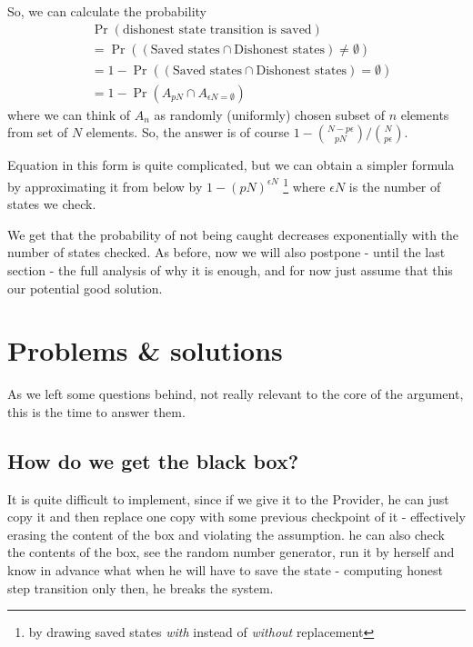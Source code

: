 \documentclass{winnower}
\begin{document}
So, we can calculate the probability 
\begin{equation}
\begin{aligned}
&\Pr(\text{dishonest state transition is saved}) \\
&= \Pr((\text{Saved states} \cap \text{Dishonest states}) \neq \emptyset) \\
&= 1 - \Pr((\text{Saved states} \cap \text{Dishonest states}) = \emptyset) \\
&= 1 - \Pr(A_{p N} \cap A_{\epsilon N = \emptyset})
\end{aligned}
\end{equation}
where we can think of $A_n$ as randomly (uniformly) chosen subset of $n$ elements from set of $N$ elements. So, the answer is of course $1 - {{N - p \epsilon}\choose{p N}} / {{N}\choose{p \epsilon}}$.

Equation in this form is quite complicated, but we can obtain a simpler formula by approximating it from below by $ 1 - (p N)^{\epsilon N}$ \footnote{by drawing saved states \textit{with} instead of \textit{without} replacement} where $\epsilon N$ is the number of states we check.

We get that the probability of not being caught decreases exponentially with the number of states checked. As before, now we will also postpone - until the last section - the full analysis of why it is enough, and for now just assume that this our potential good solution.

\section{Problems \& solutions}
As we left some questions behind, not really relevant to the core of the argument, this is the time to answer them.
\subsection{How do we get the black box?}
It is quite difficult to implement, since if we give it to the Provider, he can just copy it and then replace one copy with some previous checkpoint of it - effectively erasing the content of the box and violating the assumption. he can also check the contents of the box, see the random number generator, run it by herself and know in advance what when he will have to save the state - computing honest step transition only then, he breaks the system.
\end{document}
